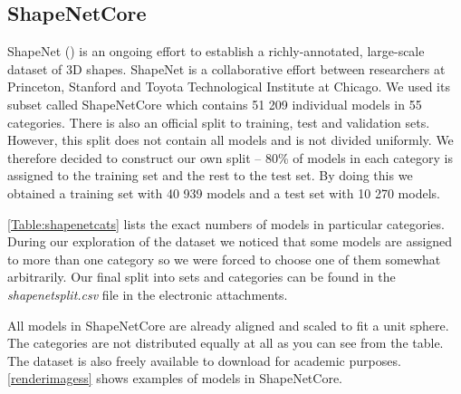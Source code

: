 


\subsection{ShapeNetCore}
\label{sec:shapenetcore}
ShapeNet (\cite{chang_shapenet:_2015}) is an ongoing effort to establish a richly-annotated, large-scale dataset of 3D shapes. ShapeNet is a collaborative effort between researchers at Princeton, Stanford and Toyota Technological Institute at Chicago. We used its subset called ShapeNetCore which contains 51 209 individual models in 55 categories. There is also an official split to training, test and validation sets. However, this split does not contain all models and is not divided uniformly. We therefore decided to construct our own split -- 80\% of models in each category is assigned to the training set and the rest to the test set. By doing this we obtained a training set with 40 939 models and a test set with 10 270 models. \par \autoref{Table:shapenetcats} lists the exact numbers of models in particular categories. During our exploration of the dataset we noticed that some models are assigned to more than one category so we were forced to choose one of them somewhat arbitrarily. Our final split into sets and categories can be found in the \textit{shapenetsplit.csv} file in the electronic attachments.\par



All models in ShapeNetCore are already aligned and scaled to fit a unit sphere. The categories are not distributed equally at all as you can see from the table. The dataset is also freely available to download for academic purposes. \autoref{renderimagess} shows examples of models in ShapeNetCore.




